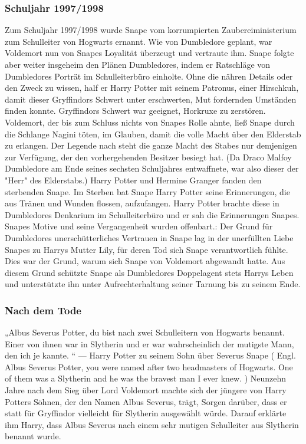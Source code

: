 \documentclass[a4paper, 10pt]{article}
\begin{document}
\subsubsection*{Schuljahr 1997/1998}
Zum Schuljahr 1997/1998 wurde Snape vom korrumpierten Zaubereiministerium zum Schulleiter von Hogwarts ernannt. Wie von Dumbledore geplant, war Voldemort nun von Snapes Loyalität überzeugt und vertraute ihm. Snape folgte aber weiter insgeheim den Plänen Dumbledores, indem er Ratschläge von Dumbledores Porträt im Schulleiterbüro einholte. Ohne die nähren Details oder den Zweck zu wissen, half er Harry Potter mit seinem Patronus, einer Hirschkuh, damit dieser Gryffindors Schwert unter erschwerten, Mut fordernden Umständen finden konnte. Gryffindors Schwert war geeignet, Horkruxe zu zerstören. Voldemort, der bis zum Schluss nichts von Snapes Rolle ahnte, ließ Snape durch die Schlange Nagini töten, im Glauben, damit die volle Macht über den Elderstab zu erlangen. Der Legende nach steht die ganze Macht des Stabes nur demjenigen zur Verfügung, der den vorhergehenden Besitzer besiegt hat. (Da Draco Malfoy Dumbledore am Ende seines sechsten Schuljahres entwaffnete, war also dieser der "Herr" des Elderstabs.) Harry Potter und Hermine Granger fanden den sterbenden Snape. Im Sterben bat Snape Harry Potter seine Erinnerungen, die aus Tränen und Wunden flossen, aufzufangen. Harry Potter brachte diese in Dumbledores Denkarium im Schulleiterbüro und er sah die Erinnerungen Snapes. Snapes Motive und seine Vergangenheit wurden offenbart.: Der Grund für Dumbledores unerschütterliches Vertrauen in Snape lag in der unerfüllten Liebe Snapes zu Harrys Mutter Lily, für deren Tod sich Snape verantwortlich fühlte. Dies war der Grund, warum sich Snape von Voldemort abgewandt hatte. Aus diesem Grund schützte Snape als Dumbledores Doppelagent stets Harrys Leben und unterstützte ihn unter Aufrechterhaltung seiner Tarnung bis zu seinem Ende.

\subsubsection*{\large Nach dem Tode}
„Albus Severus Potter, du bist nach zwei Schulleitern von Hogwarts benannt. Einer von ihnen war in Slytherin und er war wahrscheinlich der mutigste Mann, den ich je kannte. “
\vspace{10pt}
\newline
{}  
— Harry Potter zu seinem Sohn über Severus Snape
\vspace{10pt}
\newline
{}  
(  Engl.  Albus Severus Potter, you were named after two headmasters of Hogwarts. One of them was a Slytherin and he was the bravest man I ever knew. )
\vspace{10pt}
\newline
{}  
Neunzehn Jahre nach dem Sieg über Lord Voldemort machte sich der jüngere von Harry Potters Söhnen, der den Namen Albus Severus, trägt, Sorgen darüber, dass er statt für Gryffindor vielleicht für Slytherin ausgewählt würde. Darauf erklärte ihm Harry, dass Albus Severus nach einem sehr mutigen Schulleiter aus Slytherin benannt wurde.
\end{document}
